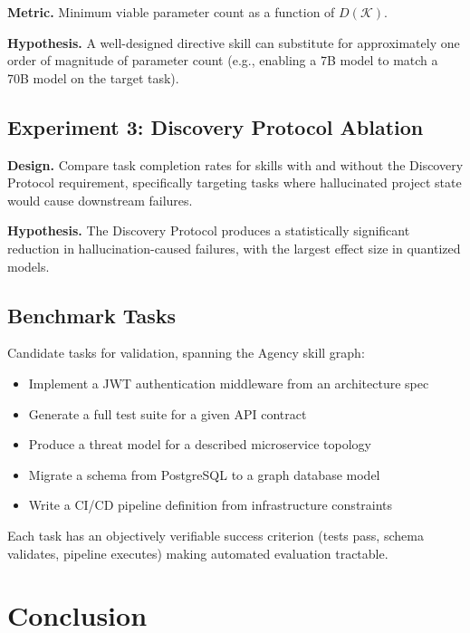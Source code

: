 \documentclass[11pt,a4paper]{article}
\begin{document}
\textbf{Metric.} Minimum viable parameter count as a function of $D(\mathcal{K})$.

\textbf{Hypothesis.} A well-designed directive skill can substitute for
approximately one order of magnitude of parameter count (e.g., enabling a
7B model to match a 70B model on the target task).

\subsection{Experiment 3: Discovery Protocol Ablation}

\textbf{Design.} Compare task completion rates for skills with and without
the Discovery Protocol requirement, specifically targeting tasks where
hallucinated project state would cause downstream failures.

\textbf{Hypothesis.} The Discovery Protocol produces a statistically
significant reduction in hallucination-caused failures, with the largest
effect size in quantized models.

\subsection{Benchmark Tasks}

Candidate tasks for validation, spanning the Agency skill graph:

\begin{itemize}[noitemsep]
  \item Implement a JWT authentication middleware from an architecture spec
  \item Generate a full test suite for a given API contract
  \item Produce a threat model for a described microservice topology
  \item Migrate a schema from PostgreSQL to a graph database model
  \item Write a CI/CD pipeline definition from infrastructure constraints
\end{itemize}

Each task has an objectively verifiable success criterion (tests pass,
schema validates, pipeline executes) making automated evaluation tractable.

\section{Conclusion}
\label{sec:conclusion}
\end{document}
